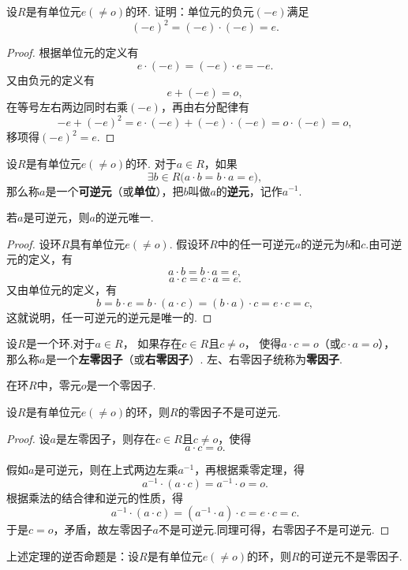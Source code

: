 \begin{example}
设\(R\)是有单位元\(e(\neq o)\)的环.
证明：单位元的负元\((-e)\)满足\[
(-e)^2=(-e)\cdot(-e)=e.
\]
\begin{proof}
根据单位元的定义有\[
e \cdot (-e) = (-e) \cdot e = -e.
\]又由负元的定义有\[
e + (-e) = o,
\]在等号左右两边同时右乘\((-e)\)，再由右分配律有\[
-e + (-e)^2 = e \cdot (-e) + (-e) \cdot (-e) = o \cdot (-e) = o,
\]移项得\((-e)^2 = e\).
\end{proof}
\end{example}

\begin{definition}
设\(R\)是有单位元\(e(\neq o)\)的环.
对于\(a \in R\)，如果\[
\exists b \in R \bigl( a \cdot b = b \cdot a = e \bigr),
\]那么称\(a\)是一个\textbf{可逆元}（或\textbf{单位}），把\(b\)叫做\(a\)的\textbf{逆元}，记作\(a^{-1}\).
\end{definition}

\begin{property}
若\(a\)是可逆元，则\(a\)的逆元唯一.
\begin{proof}
设环\(R\)具有单位元\(e(\neq o)\).
假设环\(R\)中的任一可逆元\(a\)的逆元为\(b\)和\(c\).由可逆元的定义，有\[
a \cdot b = b \cdot a = e,
\]\[
a \cdot c = c \cdot a = e.
\]又由单位元的定义，有\[
b = b \cdot e
= b \cdot (a \cdot c)
= (b \cdot a) \cdot c
= e \cdot c
= c,
\]这就说明，任一可逆元的逆元是唯一的.
\end{proof}
\end{property}

\begin{definition}
设\(R\)是一个环.对于\(a \in R\)，%
如果存在\(c \in R\)且\(c \neq o\)，%
使得\(a \cdot c = o\)（或\(c \cdot a = o\)），%
那么称\(a\)是一个\textbf{左零因子}（或\textbf{右零因子}）.
左、右零因子统称为\textbf{零因子}.
\end{definition}

\begin{property}
在环\(R\)中，零元\(o\)是一个零因子.
\end{property}

\begin{theorem}
设\(R\)是有单位元\(e(\neq o)\)的环，则\(R\)的零因子不是可逆元.
\begin{proof}
设\(a\)是左零因子，则存在\(c \in R\)且\(c \neq o\)，使得\[
a \cdot c = o.
\]

假如\(a\)是可逆元，则在上式两边左乘\(a^{-1}\)，再根据乘零定理，得\[
a^{-1} \cdot (a \cdot c) = a^{-1} \cdot o = o.
\]根据乘法的结合律和逆元的性质，得\[
a^{-1} \cdot (a \cdot c) = (a^{-1} \cdot a) \cdot c = e \cdot c = c.
\]于是\(c = o\)，矛盾，故左零因子\(a\)不是可逆元.同理可得，右零因子不是可逆元.
\end{proof}
\end{theorem}
上述定理的逆否命题是：设\(R\)是有单位元\(e(\neq o)\)的环，则\(R\)的可逆元不是零因子.

